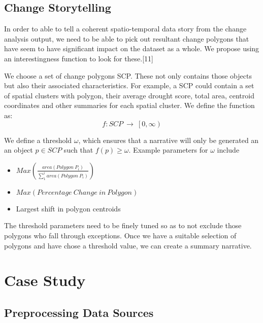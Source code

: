 \documentclass[conference]{IEEEtran}
\begin{document}
%



\subsection{Change Storytelling}

In order to able to tell a coherent spatio-temporal data story from the change analysis output, we need to be able to pick out resultant change polygons that have seem to have significant impact on the dataset as a whole. We propose using an interestingness function to look for these.[11]

We choose a set of change polygons SCP. These not only contains those objects but also their associated characteristics. For example, a SCP could contain a set of spatial clusters with polygon, their average drought score, total area, centroid coordinates and other summaries for each spatial cluster. We define the function as:
\[f:SCP\ \rightarrow\ \left[0\right.,\left.\infty\right)\]

We define a threshold $\omega$, which ensures that a narrative will only be generated an an object $p \in SCP$ such that $f(p) \ge \omega$. Example parameters for $\omega$ include  

\begin{itemize}
\item $Max\left(\frac{area\left(Polygon\ P_i\right)}{\sum_{1}^{i}area\left(Polygon\ P_i\right)}\right)$
\item $Max\left(Percentage\ Change\ in\ Polygon\right)$
\item Largest shift in polygon centroids
\end{itemize}

The threshold parameters need to be finely tuned so as to not exclude those polygons who fall through exceptions. Once we have a suitable selection of polygons and have chose a threshold value, we can create a summary narrative. 


\section{Case Study}

\subsection{Preprocessing Data Sources}
\end{document}

